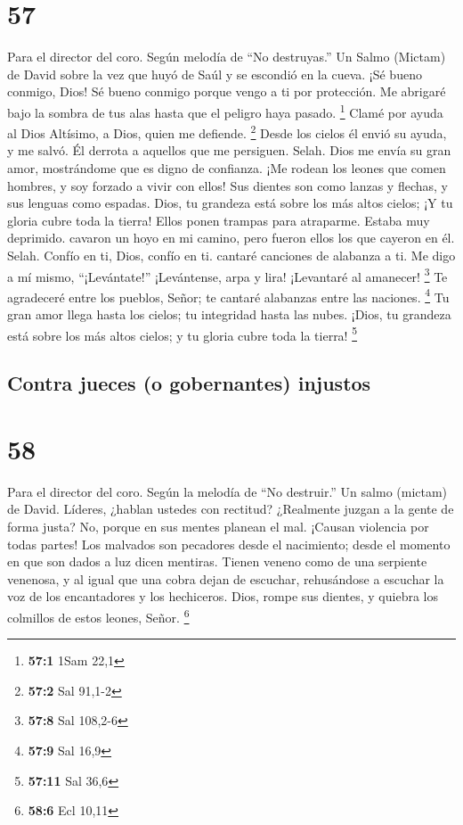 \hypertarget{section-56}{%
\section{57}\label{section-56}}

Para el director del coro. Según melodía de ``No destruyas.'' Un Salmo
(Mictam) de David sobre la vez que huyó de Saúl y se escondió en la
cueva.  ¡Sé bueno conmigo, Dios! Sé bueno conmigo porque
vengo a ti por protección. Me abrigaré bajo la sombra de tus alas hasta
que el peligro haya pasado. \footnote{\textbf{57:1} 1Sam 22,1}
 Clamé por ayuda al Dios Altísimo, a Dios, quien me
defiende. \footnote{\textbf{57:2} Sal 91,1-2}  Desde los
cielos él envió su ayuda, y me salvó. Él derrota a aquellos que me
persiguen. Selah. Dios me envía su gran amor, mostrándome que es digno
de confianza.  ¡Me rodean los leones que comen hombres, y
soy forzado a vivir con ellos! Sus dientes son como lanzas y flechas, y
sus lenguas como espadas.  Dios, tu grandeza está sobre los
más altos cielos; ¡Y tu gloria cubre toda la tierra!  Ellos
ponen trampas para atraparme. Estaba muy deprimido. cavaron un hoyo en
mi camino, pero fueron ellos los que cayeron en él. Selah. 
Confío en ti, Dios, confío en ti. cantaré canciones de alabanza a ti.
 Me digo a mí mismo, ``¡Levántate!'' ¡Levántense, arpa y
lira! ¡Levantaré al amanecer! \footnote{\textbf{57:8} Sal 108,2-6}
 Te agradeceré entre los pueblos, Señor; te cantaré
alabanzas entre las naciones. \footnote{\textbf{57:9} Sal 16,9}
 Tu gran amor llega hasta los cielos; tu integridad hasta
las nubes.  ¡Dios, tu grandeza está sobre los más altos
cielos; y tu gloria cubre toda la tierra! \footnote{\textbf{57:11} Sal
  36,6}

\hypertarget{contra-jueces-o-gobernantes-injustos}{%
\subsection{Contra jueces (o gobernantes)
injustos}\label{contra-jueces-o-gobernantes-injustos}}

\hypertarget{section-57}{%
\section{58}\label{section-57}}

Para el director del coro. Según la melodía de ``No destruir.'' Un salmo
(mictam) de David.  Líderes, ¿hablan ustedes con rectitud?
¿Realmente juzgan a la gente de forma justa?  No, porque en
sus mentes planean el mal. ¡Causan violencia por todas partes!
 Los malvados son pecadores desde el nacimiento; desde el
momento en que son dados a luz dicen mentiras.  Tienen
veneno como de una serpiente venenosa, y al igual que una cobra dejan de
escuchar,  rehusándose a escuchar la voz de los encantadores
y los hechiceros.  Dios, rompe sus dientes, y quiebra los
colmillos de estos leones, Señor. \footnote{\textbf{58:6} Ecl 10,11}

